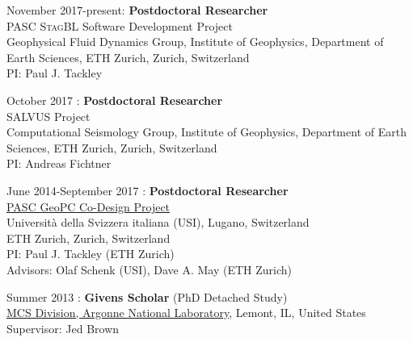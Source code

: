 
\begin{samepage}
\noindent November 2017-present: \textbf{Postdoctoral Researcher} \\
PASC \textsc{StagBL} Software Development Project \\
Geophysical Fluid Dynamics Group, Institute of Geophysics, Department of Earth Sciences, ETH Zurich, Zurich, Switzerland \\
PI: Paul J. Tackley \\
\end{samepage}

\begin{samepage}
\noindent October 2017 : \textbf{Postdoctoral Researcher}\\
\textsc{SALVUS} Project\\
Computational Seismology Group, Institute of Geophysics, Department of Earth Sciences, ETH Zurich, Zurich, Switzerland \\
PI: Andreas Fichtner \\
\end{samepage}

\begin{samepage}
\noindent June 2014-September 2017 : \textbf{Postdoctoral Researcher} \\
\href{http://www.pasc-ch.org/projects/projects/geopc/}{PASC GeoPC Co-Design Project} \\
Universit\`{a} della Svizzera italiana (USI), Lugano, Switzerland \\
ETH Zurich, Zurich, Switzerland \\
PI: Paul J. Tackley (ETH Zurich) \\
Advisors: Olaf Schenk (USI), Dave A. May (ETH Zurich) \\

\end{samepage}

\begin{samepage}
\noindent Summer 2013 : \textbf{Givens Scholar} (PhD Detached Study) \\
\href{http://www.mcs.anl.gov}{MCS Division, Argonne National Laboratory}, Lemont, IL, United States \\
Supervisor: Jed Brown \\
\end{samepage}

